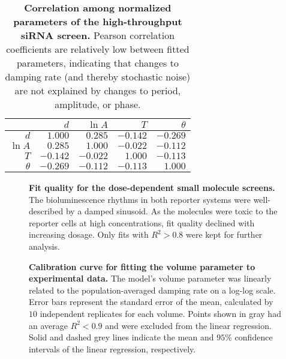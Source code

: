\documentclass[11pt, letterpaper]{article}
\newcommand{\beginsupplement}{%
        \clearpage
        \setcounter{table}{0}
        \renewcommand{\thetable}{S\arabic{table}}%
        \setcounter{figure}{0}
        \renewcommand{\thefigure}{S\arabic{figure}}%
     }
\begin{document}
\begin{table}[h!]
  \begin{center}
    \begin{tabular}{rrrrr}
      \toprule
      {}       & $d$    & $\ln A$ & $T$    & $\theta$ \\\midrule
      $d$      & $1.000 $ & $0.285 $  & $-0.142$ & $-0.269$\\
      $\ln A$  & $0.285 $ & $1.000 $  & $-0.022$ & $-0.112$\\
      $T$      & $-0.142$ & $-0.022$  & $1.000 $ & $-0.113$\\
      $\theta$ & $-0.269$ & $-0.112$  & $-0.113$ & $1.000 $\\
      \bottomrule
    \end{tabular}
  \end{center}
  \caption{{\bfseries Correlation among normalized parameters of the high-throughput siRNA screen.} Pearson correlation coefficients are relatively low between fitted parameters, indicating that changes to damping rate (and thereby stochastic noise) are not explained by changes to period, amplitude, or phase.}
  \label{tab:corr}
\end{table}

\beginsupplement

\begin{figure}[tbp]
  \begin{center}
  \end{center}
  \caption{{\bfseries Fit quality for the dose-dependent small molecule screens.} The bioluminescence rhythms in both reporter systems were well-described by a damped sinusoid. As the molecules were toxic to the reporter cells at high concentrations, fit quality declined with increasing dosage. Only fits with $R^2 > 0.8$ were kept for further analysis.}
\label{fig:small_molecule_r2}
\end{figure}

\begin{figure}[tbp]
  \begin{center}
  \end{center}
  \caption{{\bfseries Calibration curve for fitting the volume parameter to experimental data.} The model's volume parameter was linearly related to the population-averaged damping rate on a log-log scale. Error bars represent the standard error of the mean, calculated by $10$ independent replicates for each volume. Points shown in gray had an average $R^2 < 0.9$ and were excluded from the linear regression. Solid and dashed grey lines indicate the mean and $95\%$ confidence intervals of the linear regression, respectively.}
\label{fig:vol_calibration}
\end{figure}
\end{document}
